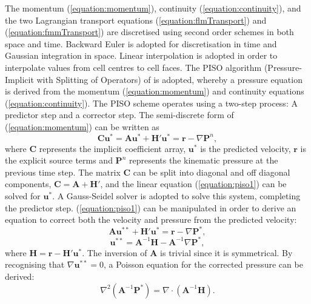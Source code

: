\documentclass[12pt,oneside,a4paper]{article}
\newcommand{\vect}[1]{\boldsymbol{#1}}
\begin{document}
The momentum (\ref{equation:momentum}), continuity (\ref{equation:continuity}), and the two Lagrangian transport equations (\ref{equation:flmTransport}) and (\ref{equation:fmmTransport}) are discretised using second order schemes in both space and time. Backward Euler is adopted for discretisation in time and Gaussian integration in space. Linear interpolation is adopted in order to interpolate values from cell centres to cell faces. The PISO algorithm (Pressure-Implicit with Splitting of Operators) of \cite{issa1986} is adopted, whereby a pressure equation is derived from the momentum (\ref{equation:momentum}) and continuity equations (\ref{equation:continuity}). The PISO scheme operates using a two-step process: A predictor step and a corrector step. The semi-discrete form of (\ref{equation:momentum}) can be written as
\begin{equation}
\label{equation:piso1}
\vect{C} \vect{u}^* =  \vect{A}\vect{u}^* + \vect{H'}\vect{u}^* =\vect{r} - \nabla \vect{P}^n,
\end{equation} 
where $\vect{C}$ represents the implicit coefficient array, $\vect{u}^*$ is the predicted velocity, $\vect{r}$ is the explicit source terms and $\vect{P}^n$ represents the kinematic pressure at the previous time step. The matrix $\vect{C}$ can be split into diagonal and off diagonal components, $\vect{C} = \vect{A} + \vect{H'}$, and the linear equation (\ref{equation:piso1}) can be solved for $\vect{u}^*$. A Gauss-Seidel solver is adopted to solve this system, completing the predictor step. (\ref{equation:piso1}) can be manipulated in order to derive an equation to correct both the velocity and pressure from the predicted velocity:
\begin{equation}
\label{equation:piso2}
\vect{A}\vect{u}^{**} + \vect{H'}\vect{u}^* =\vect{r} - \nabla \vect{P}^*,
\end{equation}
\begin{equation}
\label{equation:piso3}
\vect{u}^{**}  = \vect{A}^{-1}\vect{H} - \vect{A}^{-1}\nabla \vect{P}^*,
\end{equation}
where $\vect{H} = \vect{r} - \vect{H'}\vect{u}^*$. The inversion of $\vect{A}$ is trivial since it is symmetrical. By recognising that $\nabla \vect{u}^{**} = 0$, a Poisson equation for the corrected pressure can be derived:
\begin{equation}
\label{equation:piso4}
\nabla^2 ( \vect{A}^{-1} \vect{P}^* ) = \nabla \cdot (\vect{A}^{-1} \vect{H}).
\end{equation}
\end{document}

